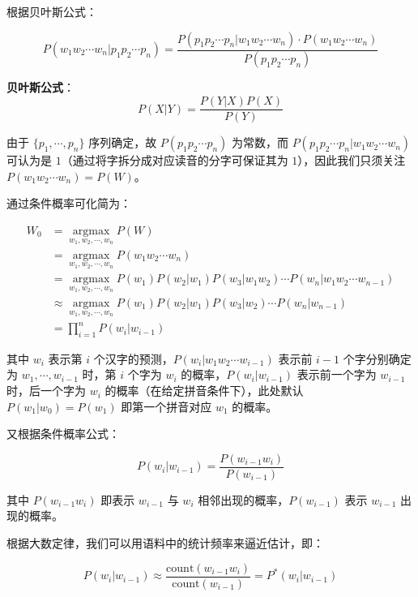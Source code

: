 \documentclass[a4paper]{article}
\newenvironment{lightgrayleftbar}{%
  \def\FrameCommand{\textcolor{lightgray}{\vrule width 3pt} \hspace{3pt}}%
  \MakeFramed {\advance\hsize-\width \FrameRestore}}%
{\endMakeFramed}
\begin{document}
    根据贝叶斯公式：

    \[P(w_1 w_2 \cdots w_n | p_1 p_2 \cdots p_n) = \frac{P(p_1 p_2 \cdots p_n | w_1 w_2 \cdots w_n) \cdot P(w_1 w_2 \cdots w_n)}{P(p_1p_2 \cdots p_n)}\]

    \begin{lightgrayleftbar}
        \textbf{贝叶斯公式}：
        \[P(X | Y) = \frac{P(Y | X) P(X)}{P(Y)}\]
    \end{lightgrayleftbar}

    由于 \(\{p_1, \cdots, p_n\}\) 序列确定，故 \(P(p_1 p_2 \cdots p_n)\) 为常数，而 \(P(p_1 p_2 \cdots p_n | w_1 w_2 \cdots w_n)\) 可认为是 \(1\)（通过将字拆分成对应读音的分字可保证其为 \(1\)），因此我们只须关注 \(P(w_1 w_2 \cdots w_n) = P(W)\)。

    \newpage
    通过条件概率可化简为：

    \begin{align*}
        W_0 & = \mathop{\arg \max}\limits_{w_1, w_2, \cdots, w_n} P(W) \\
        & = \mathop{\arg \max}\limits_{w_1, w_2, \cdots, w_n} P(w_1 w_2 \cdots w_n) \\
        & = \mathop{\arg \max}\limits_{w_1, w_2, \cdots, w_n} P(w_1) P(w_2 |w_1) P(w_3 | w_1 w_2) \cdots P(w_n | w_1 w_2 \cdots w_{n - 1}) \\
        & \approx \mathop{\arg \max}\limits_{w_1, w_2, \cdots, w_n} P(w_1) P(w_2 | w_1) P(w_3 | w_2) \cdots P(w_n | w_{n - 1}) \\
        & = \prod_{i = 1}^n P(w_i | w_{i - 1})
    \end{align*}

    其中 \(w_i\) 表示第 \(i\) 个汉字的预测，\(P(w_i | w_1 w_2 \cdots w_{i - 1})\) 表示前 \(i - 1\) 个字分别确定为 \(w_1, \cdots, w_{i - 1}\) 时，第 \(i\) 个字为 \(w_i\) 的概率，\(P(w_i | w_{i - 1})\) 表示前一个字为 \(w_{i - 1}\) 时，后一个字为 \(w_i\) 的概率（在给定拼音条件下），此处默认 \(P(w_1 | w_0) = P(w_1)\) 即第一个拼音对应 \(w_1\) 的概率。

    又根据条件概率公式：

    \[P(w_i | w_{i - 1}) = \frac{P(w_{i - 1} w_i)}{P(w_{i - 1})}\]

    其中 \(P(w_{i - 1} w_i)\) 即表示 \(w_{i - 1}\) 与 \(w_i\) 相邻出现的概率，\(P(w_{i - 1})\) 表示 \(w_{i - 1}\) 出现的概率。

    根据大数定律，我们可以用语料中的统计频率来逼近估计，即：

    \[P(w_i | w_{i - 1}) \approx \frac{\mathrm{count}(w_{i - 1} w_i)}{\mathrm{count}(w_{i - 1})} = P^*(w_i | w_{i - 1})\]
\end{document}
